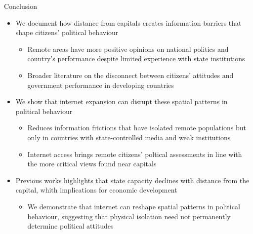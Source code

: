 \documentclass[10pt]{beamer}
\begin{document}
\begin{frame}{Conclusion}

    \begin{itemize}\setlength\itemsep{1em}

        \item We document how distance from capitals creates information barriers that shape citizens' political behaviour
        \begin{itemize}\setlength\itemsep{1em}

            \item Remote areas have more positive opinions on national politics and country's performance despite limited experience with state institutions
            \item Broader literature on the disconnect between citizens' attitudes and government performance in developing countries
        \end{itemize}
        \item We show that internet expansion can disrupt these spatial patterns in political behaviour
        \begin{itemize}\setlength\itemsep{1em}

            \item Reduces information frictions that have isolated remote populations but only in countries with state-controlled media and weak institutions
            \item Internet access brings remote citizens' poltical assessments in line with the more critical views found near capitals
        \end{itemize}
        \item Previous works highlights that state capacity declines with distance from the capital, whith implications for economic development
        \begin{itemize}\setlength\itemsep{1em}

            \item We demonstrate that internet can reshape spatial patterns in political behaviour, suggesting that physical isolation need not permanently determine political attitudes
        \end{itemize}
    \end{itemize}
    
\end{frame}
\end{document}

